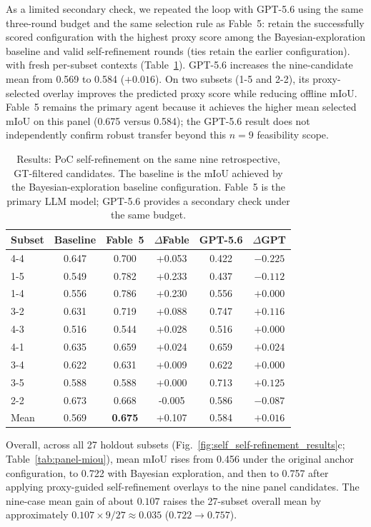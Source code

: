 \documentclass[a4paper,fleqn]{cas-dc}
\begin{document}
{As a limited secondary check, we repeated the loop with GPT-5.6 using the same three-round budget and the same selection rule as Fable~5: retain the successfully scored configuration with the highest proxy score among the Bayesian-exploration baseline and valid self-refinement rounds (ties retain the earlier configuration).
with fresh per-subset contexts (Table~\ref{tab:poc-model-compare}). GPT-5.6
increases the nine-candidate mean from 0.569 to 0.584 ($+0.016$). On two
subsets (1-5 and 2-2), its proxy-selected overlay improves the predicted proxy
score while reducing offline mIoU. Fable~5 remains the primary agent because
it achieves the higher mean selected mIoU on this panel (0.675 versus 0.584);
the GPT-5.6 result does not independently confirm robust transfer beyond this
$n=9$ feasibility scope.

\begin{table}[ht]
\caption{Results: PoC self-refinement on the same nine retrospective, GT-filtered candidates. The baseline is the mIoU achieved by the Bayesian-exploration baseline configuration. Fable~5 is the primary LLM model; GPT-5.6 provides a secondary check under the same budget.}\label{tab:poc-model-compare}
{\small
\begin{tabular*}{\tblwidth}{@{} l c c c c c @{}}
\toprule
Subset & Baseline & \textbf{Fable~5} & \boldmath$\Delta$Fable & GPT-5.6 & $\Delta$GPT \\
\midrule
4-4 & 0.647 & 0.700 & +0.053 & 0.422 & $-0.225$ \\
1-5 & 0.549 & 0.782 & +0.233 & 0.437 & $-0.112$ \\
1-4 & 0.556 & 0.786 & +0.230 & 0.556 & $+0.000$ \\
3-2 & 0.631 & 0.719 & +0.088 & 0.747 & $+0.116$ \\
4-3 & 0.516 & 0.544 & +0.028 & 0.516 & $+0.000$ \\
4-1 & 0.635 & 0.659 & +0.024 & 0.659 & $+0.024$ \\
3-4 & 0.622 & 0.631 & +0.009 & 0.622 & $+0.000$ \\
3-5 & 0.588 & 0.588 & +0.000 & 0.713 & $+0.125$ \\
2-2 & 0.673 & 0.668 & -0.005 & 0.586 & $-0.087$ \\
\midrule
Mean & 0.569 & \textbf{0.675} & +0.107 & 0.584 & $+0.016$ \\
\bottomrule
\end{tabular*}}
\end{table}

Overall, across all 27 holdout subsets
(Fig.~\ref{fig:self_self-refinement_results}c; Table~\ref{tab:panel-miou}), mean mIoU rises from 0.456 under
the original anchor configuration, to
0.722 with Bayesian exploration, and then to 0.757 after applying proxy-guided self-refinement overlays to the nine panel candidates. The nine-case mean gain of about $0.107$ raises the 27-subset overall mean by approximately
$0.107\times 9/27\approx 0.035$ ($0.722\rightarrow 0.757$).

}
\end{document}
